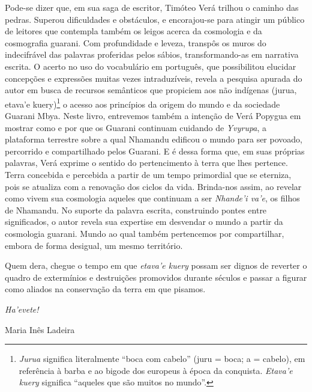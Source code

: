 Pode-se
dizer que, em sua saga de escritor, Timóteo Verá trilhou o caminho das pedras.
Superou dificuldades e obstáculos, e encorajou-se para atingir um público de
leitores que contempla também os leigos acerca da cosmologia e da cosmografia
guarani. Com profundidade e leveza, transpôs os muros do indecifrável das
palavras proferidas pelos sábios, transformando-as em narrativa escrita. O
acerto no uso do vocabulário em português, que possibilitou elucidar concepções
e expressões muitas vezes intraduzíveis, revela a pesquisa apurada do autor em
busca de recursos semânticos que propiciem aos não indígenas (jurua, etava’e
kuery)\footnote{\emph{Jurua} significa literalmente “boca com cabelo” (juru = boca; a
    = cabelo), em referência à barba e ao bigode dos europeus à época da
    conquista.  \emph{Etava’e kuery} significa “aqueles que são muitos no mundo”.} o
acesso aos princípios da origem do mundo e da sociedade Guarani Mbya.  Neste
livro, entrevemos também a intenção de Verá Popygua em mostrar como e por que
os Guarani continuam cuidando de \emph{Yvyrupa}, a plataforma terrestre sobre a qual
Nhamandu edificou o mundo para ser povoado, percorrido e compartilhado pelos
Guarani. E é dessa forma que, em suas próprias palavras, Verá exprime o sentido
do pertencimento à terra que lhes pertence. Terra concebida e percebida a
partir de um tempo primordial que se eterniza, pois se atualiza com a renovação
dos ciclos da vida. Brinda-nos assim, ao revelar como vivem sua cosmologia
aqueles que continuam a ser \emph{Nhande’i va’e}, os filhos de Nhamandu.  No suporte
da palavra escrita, construindo pontes entre significados, o autor revela sua
expertise em desvendar o mundo a partir da cosmologia guarani. Mundo ao qual
também pertencemos por compartilhar, embora de forma desigual, um mesmo
território.

Quem dera, chegue o tempo em que \emph{etava’e kuery} possam ser dignos
de reverter o quadro de extermínios e destruições promovidos durante séculos e
passar a figurar como aliados na conservação da terra em que pisamos.


\medskip\hfill\emph{Ha’evete!}

\bigskip
\hfill Maria Inês Ladeira
